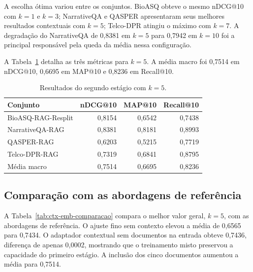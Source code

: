 A escolha ótima variou entre os conjuntos. BioASQ obteve o mesmo nDCG@10 com $k=1$ e $k=3$; NarrativeQA e QASPER apresentaram seus melhores resultados contextuais com $k=5$; Telco-DPR atingiu o máximo com $k=7$. A degradação do NarrativeQA de 0,8381 em $k=5$ para 0,7942 em $k=10$ foi a principal responsável pela queda da média nessa configuração.

A Tabela~\ref{tab:ctx-emb-metricas-k5} detalha as três métricas para $k=5$. A média macro foi 0,7514 em nDCG@10, 0,6695 em MAP@10 e 0,8236 em Recall@10.

\begin{table}[htbp]
    \centering
    \caption{Resultados do segundo estágio com $k=5$.}
    \label{tab:ctx-emb-metricas-k5}
    \begin{tabular}{lrrr}
        \toprule
        Conjunto & nDCG@10 & MAP@10 & Recall@10 \\
        \midrule
        BioASQ-RAG-Resplit & 0,8154 & 0,6542 & 0,7438 \\
        NarrativeQA-RAG   & 0,8381 & 0,8181 & 0,8993 \\
        QASPER-RAG        & 0,6203 & 0,5215 & 0,7719 \\
        Telco-DPR-RAG     & 0,7319 & 0,6841 & 0,8795 \\
        \midrule
        Média macro       & 0,7514 & 0,6695 & 0,8236 \\
        \bottomrule
    \end{tabular}
\end{table}

\subsection{Comparação com as abordagens de referência}

A Tabela~\ref{tab:ctx-emb-comparacao} compara o melhor valor geral, $k=5$, com as abordagens de referência. O ajuste fino sem contexto elevou a média de 0,6565 para 0,7434. O adaptador contextual sem documentos na entrada obteve 0,7436, diferença de apenas 0,0002, mostrando que o treinamento misto preservou a capacidade do primeiro estágio. A inclusão dos cinco documentos aumentou a média para 0,7514.

